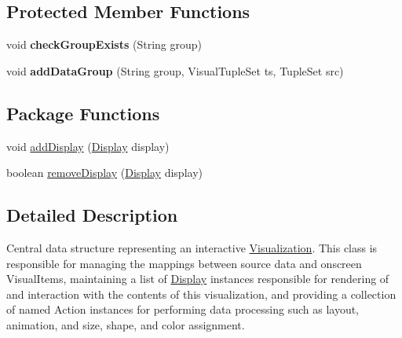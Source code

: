 \subsection*{\-Protected \-Member \-Functions}
\begin{DoxyCompactItemize}
\item 
\hypertarget{classprefuse_1_1_visualization_a2e69f1a8ea0d02b3f453499e854ea4af}{void {\bfseries check\-Group\-Exists} (\-String group)}\label{classprefuse_1_1_visualization_a2e69f1a8ea0d02b3f453499e854ea4af}

\item 
\hypertarget{classprefuse_1_1_visualization_a1d6145fc7d9ce2710d87a7b9cdbff204}{void {\bfseries add\-Data\-Group} (\-String group, \-Visual\-Tuple\-Set ts, \-Tuple\-Set src)}\label{classprefuse_1_1_visualization_a1d6145fc7d9ce2710d87a7b9cdbff204}

\end{DoxyCompactItemize}
\subsection*{\-Package \-Functions}
\begin{DoxyCompactItemize}
\item 
void \hyperlink{classprefuse_1_1_visualization_a750273588214ad6980535438a3086f64}{add\-Display} (\hyperlink{classprefuse_1_1_display}{\-Display} display)
\item 
boolean \hyperlink{classprefuse_1_1_visualization_a838a4fd91210b98183a42bafb1608f89}{remove\-Display} (\hyperlink{classprefuse_1_1_display}{\-Display} display)
\end{DoxyCompactItemize}


\subsection{\-Detailed \-Description}
\-Central data structure representing an interactive \hyperlink{classprefuse_1_1_visualization}{\-Visualization}. \-This class is responsible for managing the mappings between source data and onscreen \-Visual\-Items, maintaining a list of \hyperlink{classprefuse_1_1_display}{\-Display} instances responsible for rendering of and interaction with the contents of this visualization, and providing a collection of named \-Action instances for performing data processing such as layout, animation, and size, shape, and color assignment.

